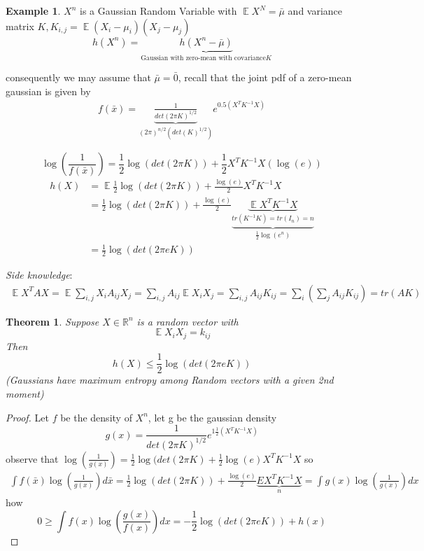 \documentclass[twoside]{article}
\newtheorem{theorem}{Theorem}[section]
\theoremstyle{definition} %
\newtheorem{example}{Example}
\def\R{\mathbb{R}}
\DeclareMathOperator{\E}{\mathbb{E}}%
\begin{document}
\begin{example}
  $X^n$ is a Gaussian Random Variable with $\E{X^N} = \bar{\mu}$ and variance matrix $K, K_{i,j} = \E{(X_i - \mu _i)(X_j - \mu_j)}$
  \[
    h(X^n) = \underbrace{h(X^n - \bar{\mu})}_{\text{Gaussian with zero-mean with covariance} K}
  \]

  consequently we may assume that $\bar{\mu} = \bar{0}$, recall that the joint pdf of a zero-mean gaussian is given by
  \begin{align*}
    f(\bar{x}) = \underbrace{\frac{1}{det(2 \pi K)^{1/2}}}_{(2 \pi)^{n/2} (det(K)^{1/2})} e^{0.5 (X^T K^{-1} X)}
  \end{align*}

  \[
    \log(\frac{1}{f(\bar{x})}) = \frac{1}{2} \log(det(2 \pi K)) + \frac{1}{2} X^T K^{-1} X(\log(e))
  \]
  \begin{align*}
    h(X) &= \E{\frac{1}{2} \log(det(2 \pi K)) + \frac{\log(e)}{2} X^T K^{-1} X } \\
    &= \frac{1}{2} \log(det(2 \pi K)) + \frac{\log(e)}{2} \underbrace{\underbrace{\E{X^T K^{-1} X}}_{tr(K^{-1}K) = tr(I_n) = n}}_{\frac{1}{2} \log(e^n)} \\
    &= \frac{1}{2} \log(det(2 \pi e K))
  \end{align*}

  \textit{Side knowledge}:
  \begin{align*}
    \E{X^T A X} = \E{\sum_{i,j} X_i A_{ij} X_j} = \sum_{i, j} A_{ij} \E{X_i X_j}
    = \sum_{i,j} A_{ij} K_{ij} = \sum_i (\sum_j A_{ij} K_{ij}) = tr(AK)
  \end{align*}
\end{example}

\begin{theorem}
  Suppose $X \in \R^n$ is a random vector with
  \[
    \E{X_i X_j} = k_{ij}
  \]
  Then
  \[
    h(X) \leq \frac{1}{2} \log(det(2 \pi e K))
  \]
  (Gaussians have maximum entropy among Random vectors with a given 2nd moment)
\end{theorem}

\begin{proof}
  Let $f$ be the density of $X^n$, let g be the gaussian density
  \[
    g(x) = \frac{1}{det(2 \pi K)^{1/2}} e^{1 \frac{1}{2}(X^T K^{-1} X)}
  \]
  observe that $\log(\frac{1}{g(x)}) = \frac{1}{2} \log(det(2 \pi K) + \frac{1}{2} \log(e) X^T K^{-1} X$
  so
  \begin{align*}
    \int f(\bar{x}) \log(\frac{1}{g(x)}) d \bar{x} = \frac{1}{2} \log(det(2 \pi K)) + \frac{\log(e)}{2} \underbrace{E{X^T K^{-1} X}}_{n}
    = \int g(x) \log(\frac{1}{g(x)}) dx
  \end{align*}
  how
  \[
    0 \geq \int f(x) \log(\frac{g(x)}{f(x)}) dx = - \frac{1}{2} \log(det(2 \pi e K)) + h(x)
  \]
\end{proof}
\end{document}
